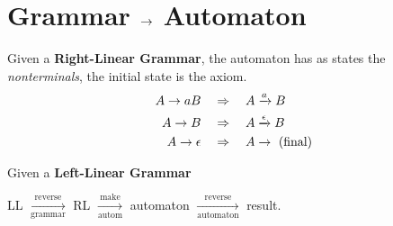 \section{Grammar $\rightarrow$ Automaton}

Given a \textbf{Right-Linear Grammar}, the automaton has as states the \emph{nonterminals}, the initial state is the axiom.
\begin{align*}
    A \rightarrow aB &\quad\Rightarrow\quad A \xrightarrow{a} B \\
    A \rightarrow B & \quad\Rightarrow\quad A \xrightarrow{\epsilon}B \\
    A \rightarrow \epsilon &\quad\Rightarrow\quad A \rightarrow \text{ (final)}
\end{align*}

Given a \textbf{Left-Linear Grammar}

LL $\xrightarrow[\text{grammar}]{\text{reverse}}$ RL $\xrightarrow[\text{autom}]{\text{make}}$ automaton $\xrightarrow[\text{automaton}]{\text{reverse}}$ result.
